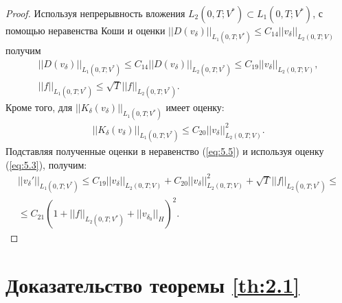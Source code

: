 \documentclass[14pt, a4paper]{extarticle}
\numberwithin{equation}{section}
\begin{document}
\begin{proof}
        Используя непрерывность вложения $L_2(0,T;V^*) \subset L_1(0,T;V^*)$, с помощью неравенства Коши и оценки
        $||D(v_\delta)||_{L_1(0,T;V^*)} \leq C_{14}||v_\delta||_{L_2(0,T;V)}$ получим
        \begin{equation*}
            \begin{gathered}
                ||D(v_\delta)||_{L_1(0,T;V^*)} \leq C_{14}||D(v_\delta)||_{L_2(0,T;V^*)} \leq C_{19}||v_\delta||_{L_2(0,T;V)},\\
                ||f||_{L_1(0,T;V^*)} \leq \sqrt{T}||f||_{L_2(0,T;V^*)}.
            \end{gathered}
        \end{equation*}
        Кроме того, для $||K_\delta(v_\delta)||_{L_1(0,T;V^*)}$ имеет оценку:
        \begin{equation*}
            \begin{gathered}
                ||K_\delta(v_\delta)||_{L_1(0,T;V^*)} \leq C_{20}||v_\delta||_{L_2(0,T;V)}^2.
            \end{gathered}
        \end{equation*}
        Подставляя полученные оценки в неравенство (\ref{eq:5.5}) и используя оценку (\ref{eq:5.3}), получим:
        \begin{equation*}
            \begin{gathered}
                ||v_\delta'||_{L_1(0,T;V^*)} \leq C_{19}||v_\delta||_{L_2(0,T;V)} + C_{20}||v_\delta||_{L_2(0,T;V)}^2
                + \sqrt{T}||f||_{L_2(0,T;V^*)} \leq\\
                \leq C_{21} (1 + ||f||_{L_2(0,T;V^*)} + ||v_{\delta_0}||_H)^2.
            \end{gathered}
        \end{equation*}
    \end{proof}

    \section{Доказательство теоремы \ref{th:2.1}}
\end{document}
